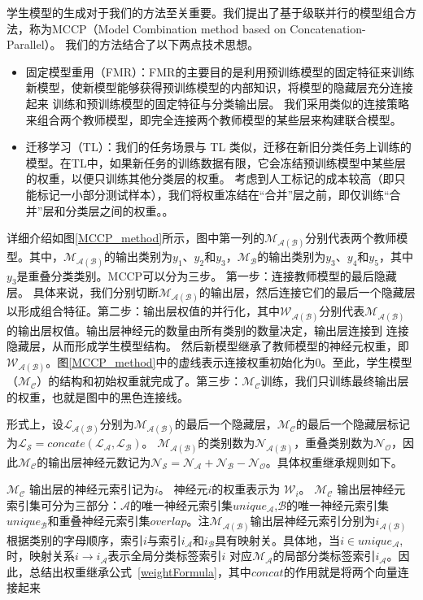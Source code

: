 \documentclass[fontset=macnew,UTF8]{article} %
\begin{document}
学生模型的生成对于我们的方法至关重要。我们提出了基于级联并行的模型组合方法，称为MCCP（Model Combination method based on Concatenation-Parallel）。 我们的方法结合了以下两点技术思想。

\begin{itemize}
	\item 固定模型重用（FMR）\cite{yang2017deep}：FMR的主要目的是利用预训练模型的固定特征来训练新模型，使新模型能够获得预训练模型的内部知识，将模型的隐藏层充分连接起来 训练和预训练模型的固定特征与分类输出层。 我们采用类似的连接策略来组合两个教师模型，即完全连接两个教师模型的某些层来构建联合模型。
	\item 迁移学习（TL）\cite{sung2022lst}：我们的任务场景与 TL 类似，迁移在新旧分类任务上训练的模型。在TL中，如果新任务的训练数据有限，它会冻结预训练模型中某些层的权重，以便只训练其他分类层的权重。 考虑到人工标记的成本较高（即只能标记一小部分测试样本），我们将权重冻结在“合并”层之前，即仅训练“合并”层和分类层之间的权重。。
\end{itemize}

详细介绍如图\ref{MCCP_method}所示，图中第一列的$\mathcal{M_{A(B)}}$分别代表两个教师模型。其中，$\mathcal{M_{A(B)}}$的输出类别为$\mathit{y_{1}}$、$\mathit{y_{2}}$和$\mathit{y_{3}}$，$\mathcal{M_{B}}$的输出类别为$\mathit{y_{3}}$、$\mathit{y_{4}}$和$\mathit{y_{5}}$，其中$\mathit{y_{3}}$是重叠分类类别。MCCP可以分为三步。 第一步：连接教师模型的最后隐藏层。 具体来说，我们分别切断$\mathcal{M_{A(B)}}$的输出层，然后连接它们的最后一个隐藏层以形成组合特征。第二步：输出层权值的并行化，其中$\mathcal{W_{A(B)}}$分别代表$\mathcal{M_{A(B)}}$的输出层权值。输出层神经元的数量由所有类别的数量决定，输出层连接到 连接隐藏层，从而形成学生模型结构。 然后新模型继承了教师模型的神经元权重，即$\mathcal{W_{A(B)}}$。图\ref{MCCP_method}中的虚线表示连接权重初始化为0。至此，学生模型（$\mathcal{M_{C}}$）的结构和初始权重就完成了。第三步：$\mathcal{M_{C}}$训练，我们只训练最终输出层的权重，也就是图中的黑色连接线。

形式上，设$\mathcal{L_{A(B)}}$分别为$\mathcal{M_{A(B)}}$的最后一个隐藏层，$\mathcal{M_{C}}$的最后一个隐藏层标记为$\mathcal{L_S} = \mathit{concate}(\mathcal{L_A,L_B})$。 $\mathcal{M_{A(B)}}$的类别数为$\mathcal{N_{A(B)}}$，重叠类别数为$\mathcal{N_O}$，因此$\mathcal{M_{C}}$的输出层神经元数记为$\mathcal{N_S=N_A+N_B-N_O}$。具体权重继承规则如下。

$\mathcal{M_{C}}$ 输出层的神经元索引记为$\mathit{i}$。 神经元$\mathit{i}$的权重表示为 $\mathcal{W}_i$。 $\mathcal{M_{C}}$ 输出层神经元索引集可分为三部分：$\mathcal{A}$的唯一神经元索引集$\mathit{unique_\mathcal{A}}$,$\mathcal{B}$的唯一神经元索引集$\mathit{unique_\mathcal{B}}$和重叠神经元索引集$\mathit{overlap}$。注$\mathcal{M_{A(B)}}$输出层神经元索引分别为${i_{\mathcal{A(B)}}}$根据类别的字母顺序，索引$\mathit{i}$与索引$i_\mathcal{A}$和$i_\mathcal{B}$具有映射关。具体地，当$i \in unique_\mathcal{A}$,时，映射关系$i  \to  i_\mathcal{A}$表示全局分类标签索引$\mathit{i}$ 对应$\mathcal{M_A}$的局部分类标签索引$i_\mathcal{A}$。因此，总结出权重继承公式~\ref{weightFormula}，其中$\mathit{concat}$的作用就是将两个向量连接起来
\end{document}
